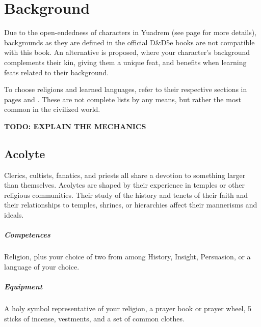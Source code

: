 \section{Background}
Due to the open-endedness of characters in Yuadrem (see page \pageref{sec::classlessdnd} for more details), backgrounds as they are defined in the official D\&D5e books are not compatible with this book.
An alternative is proposed, where your character's background complements their kin, giving them a unique feat, and benefits when learning feats related to their background.

To choose religions and learned languages, refer to their respective sections in pages \pageref{ssec::religions} and \pageref{ssec::languages}.
These are not complete lists by any means, but rather the most common in the civilized world. %

\pagebreak



\textbf{TODO: EXPLAIN THE MECHANICS}


\subsection*{Acolyte} \label{ssec::acolyte}
    Clerics, cultists, fanatics, and priests all share a devotion to something larger than themselves.
    Acolytes are shaped by their experience in temples or other religious communities.
    Their study of the history and tenets of their faith and their relationships to temples, shrines, or hierarchies affect their mannerisms and ideals.
    \subparagraph{Competences} Religion, plus your choice of two from among History, Insight, Persuasion, or a language of your choice.
    \subparagraph{Equipment} A holy symbol representative of your religion, a prayer book or prayer wheel, 5 sticks of incense, vestments, and a set of common clothes.
